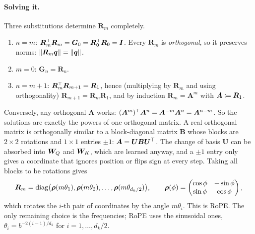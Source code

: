 \paragraph{Solving it.} Three substitutions determine $\bm{R}_m$ completely.
\begin{enumerate}
  \item $n = m$: $\bm{R}_m^{\top}\bm{R}_m = \bm{G}_0 = \bm{R}_0^{\top}\bm{R}_0 = \bm{I}$. Every
  $\bm{R}_m$ is \emph{orthogonal}, so it preserves norms: $\left\lVert \bm{R}_m\bm{q}\right\rVert =
  \left\lVert \bm{q}\right\rVert$.
  \item $m = 0$: $\bm{G}_n = \bm{R}_n$.
  \item $n = m + 1$: $\bm{R}_m^{\top}\bm{R}_{m+1} = \bm{R}_1$, hence (multiplying by
  $\bm{R}_m$ and using orthogonality) $\bm{R}_{m+1} = \bm{R}_m\bm{R}_1$, and by induction
  $\bm{R}_m = \bm{A}^m$ with $\bm{A} \coloneqq \bm{R}_1$.
\end{enumerate}
Conversely, any orthogonal $\bm{A}$ works:
$(\bm{A}^m)^{\top}\bm{A}^n = \bm{A}^{-m}\bm{A}^n = \bm{A}^{n-m}$. So the solutions are exactly the
powers of one orthogonal matrix. A real orthogonal matrix is orthogonally similar to a
block-diagonal matrix $\bm{B}$ whose blocks are $2\times 2$ rotations and $1\times 1$ entries
$\pm 1$: $\bm{A} = \bm{U}\bm{B}\bm{U}^{\top}$. The change of basis $\bm{U}$ can be absorbed
into $\bm{W}_Q$ and $\bm{W}_K$, which are learned anyway, and a $\pm 1$ entry only gives a
coordinate that ignores position or flips sign at every step. Taking all blocks to be
rotations gives
\begin{equation}\label{eq:c01-rope-matrix}
  \bm{R}_m = \operatorname{diag}\bigl(\bm{\rho}(m\theta_1), \bm{\rho}(m\theta_2), \dots, \bm{\rho}(m\theta_{d_k/2})\bigr),
  \qquad
  \bm{\rho}(\phi) = \begin{pmatrix}\cos\phi & -\sin\phi\\ \sin\phi & \cos\phi\end{pmatrix},
\end{equation}
which rotates the $i$-th pair of coordinates by the angle $m\theta_i$. This is RoPE. The only
remaining choice is the frequencies; RoPE uses the sinusoidal ones,
$\theta_i = b^{-2(i-1)/d_k}$ for $i = 1, \dots, d_k/2$.

